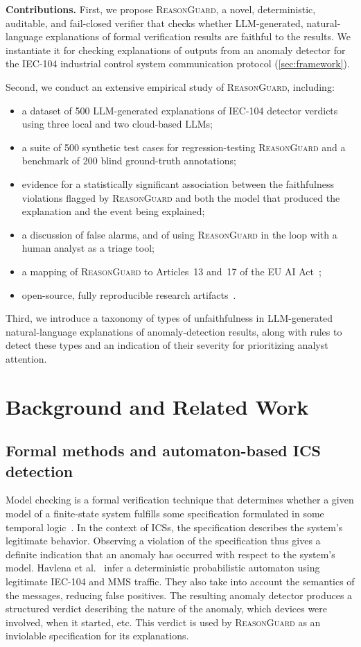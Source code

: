 \documentclass[conference]{IEEEtran}
\newcommand{\rg}{\textsc{ReasonGuard}}
\begin{document}
\noindent\textbf{Contributions.}
First, we propose \rg, a novel, deterministic, auditable, and fail-closed verifier that checks whether LLM-generated, natural-language explanations of formal verification results are faithful to the results. We instantiate it for checking explanations of outputs from an anomaly detector for the IEC-104 industrial control system communication protocol (\cref{sec:framework}).

Second, we conduct an extensive empirical study of \rg{}, including:
\begin{itemize}
  \item a dataset of 500 LLM-generated explanations of IEC-104 detector verdicts using three local and two cloud-based LLMs;
  \item a suite of 500 synthetic test cases for regression-testing \rg{} and a benchmark of 200 blind ground-truth annotations;
  \item evidence for a statistically significant association between the faithfulness violations flagged by \rg{} and both the model that produced the explanation and the event being explained;
  \item a discussion of false alarms, and of using \rg{} in the loop with a human analyst as a triage tool;
  \item a mapping of \rg{} to Articles~13 and~17 of the EU AI Act~\cite{EUAIAct2024};
  \item open-source, fully reproducible research artifacts~\cite{ReasonGuardArtifact2026}.
\end{itemize}

Third, we introduce a taxonomy of types of unfaithfulness in LLM-generated natural-language explanations of anomaly-detection results, along with rules to detect these types and an indication of their severity for prioritizing analyst attention.

\section{Background and Related Work}\label{sec:related}

\subsection{Formal methods and automaton-based ICS detection}
Model checking is a formal verification technique that determines whether a given model of a finite-state system fulfills some specification formulated in some temporal logic~\cite{ClarkeModelChecking2001}. In the context of ICSs, the specification describes the system's legitimate behavior. Observing a violation of the specification thus gives a definite indication that an anomaly has occurred with respect to the system's model. Havlena et al.~\cite{HavlenaMatousekRysavyHolik2023} infer a deterministic probabilistic automaton using legitimate IEC-104 and MMS traffic. They also take into account the semantics of the messages, reducing false positives. The resulting anomaly detector produces a structured verdict describing the nature of the anomaly, which devices were involved, when it started, etc. This verdict is used by \rg{} as an inviolable specification for its explanations.
\end{document}
